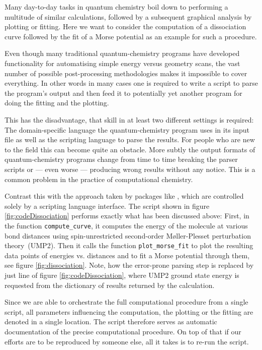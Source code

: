 Many day-to-day tasks in quantum chemistry boil down to
performing a multitude of similar calculations,
followed by a subsequent graphical analysis
by plotting or fitting.
Here we want to consider the computation of a dissociation curve
followed by the fit of a Morse potential
as an example for such a procedure.

Even though many traditional quantum-chemistry programs
have developed functionality for automatising simple
energy versus geometry scans,
the vast number of possible post-processing methodologies
makes it impossible to cover everything.
In other words in many cases one is required to write a script
to parse the program's output and then feed it to potentially yet
another program for doing the fitting and the plotting.

This has the disadvantage,
that skill in at least two different settings is required:
The domain-specific language the quantum-chemistry program uses
in its input file as well as the scripting language to parse the results.
For people who are new to the field this can become quite an obstacle.
More subtly the output formats
of quantum-chemistry programs change from time to time
breaking the parser scripts or --- even worse ---
producing wrong results without any notice.
This is a common problem in the practice of computational chemistry.

Contrast this with the approach taken by packages like \molsturm,
which are controlled solely by a scripting language interface.
The \python script shown in figure \ref{fig:codeDissociation} performs
exactly what has been discussed above:
First, in the function \texttt{compute\_curve},
it computes the energy of the  molecule
at various bond distances using spin-unrestricted
second-order Møller-Plesset perturbation theory~(UMP2).
Then it calls the function \texttt{plot\_morse\_fit}
to plot the resulting data points of energies vs. distances
and to fit a Morse potential through them,
see figure \ref{fig:dissociation}.
Note, how the error-prone parsing step is replaced by just
line \lextract of figure \ref{fig:codeDissociation},
where UMP2 ground state energy is requested from the
dictionary of results returned by the calculation.

Since we are able to orchestrate the full computational procedure
from a single script,
all parameters influencing the computation, the plotting or the fitting
are denoted in a single location.
The script therefore serves as automatic documentation
of the precise computational procedure.
On top of that if our efforts are to be reproduced by someone else,
all it takes is to re-run the script.

